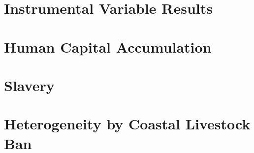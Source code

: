 \documentclass{article}
\begin{document}


\clearpage

\section{Instrumental Variable Results}



%

\clearpage



\clearpage

\section*{Human Capital Accumulation}







\clearpage 

\section*{Slavery}


\clearpage

\section*{Heterogeneity by Coastal Livestock Ban}




\end{document}
